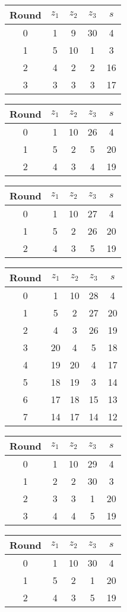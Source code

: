 \begin{multicols}{2}
\begin{tabular}{c | c | c | c | c }
Round & $z_1$ & $z_2$ & $z_3$ & $s$ \\
\hline
0 & 1 & 9 & 30 & 4 \\
1 & 5 & 10 & 1 & 3 \\
2 & 4 & 2 & 2 & 16 \\
3 & 3 & 3 & 3 & 17
\end{tabular}

\begin{tabular}{c | c | c | c | c }
Round & $z_1$ & $z_2$ & $z_3$ & $s$ \\
\hline
0 & 1 & 10 & 26 & 4 \\
1 & 5 & 2 & 5 & 20 \\
2 & 4 & 3 & 4 & 19
\end{tabular}


\begin{tabular}{c | c | c | c | c }
Round & $z_1$ & $z_2$ & $z_3$ & $s$ \\
\hline
0 & 1 & 10 & 27 & 4 \\
1 & 5 & 2 & 26 & 20 \\
2 & 4 & 3 & 5 & 19
\end{tabular}


\begin{tabular}{c | c | c | c | c }
Round & $z_1$ & $z_2$ & $z_3$ & $s$ \\
\hline
0 & 1 & 10 & 28 & 4 \\
1 & 5 & 2 & 27 & 20 \\
2 & 4 & 3 & 26 & 19 \\
3 & 20 & 4 & 5 & 18 \\
4 & 19 & 20 & 4 & 17 \\
5 & 18 & 19 & 3 & 14 \\
6 & 17 & 18 & 15 & 13 \\
7 & 14 & 17 & 14 & 12
\end{tabular}


\begin{tabular}{c | c | c | c | c }
Round & $z_1$ & $z_2$ & $z_3$ & $s$ \\
\hline
0 & 1 & 10 & 29 & 4 \\
1 & 2 & 2 & 30 & 3 \\
2 & 3 & 3 & 1 & 20 \\
3 & 4 & 4 & 5 & 19
\end{tabular}


\begin{tabular}{c | c | c | c | c }
Round & $z_1$ & $z_2$ & $z_3$ & $s$ \\
\hline
0 & 1 & 10 & 30 & 4 \\
1 & 5 & 2 & 1 & 20 \\
2 & 4 & 3 & 5 & 19
\end{tabular}



\end{multicols}
